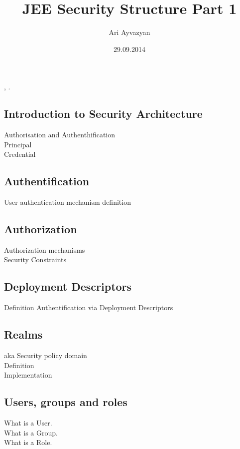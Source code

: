 \documentclass[12pt,a4paper,draft]{report}
\date{29.09.2014}
\author{Ari Ayvazyan}
\title{JEE Security Structure Part 1}
\begin{document}
\chapter*{\MyTitle}
\begin{flushright}
        \MyAuthor, \MyDate.
\end{flushright}


\section{Introduction to Security Architecture}
Authorisation and Authenthification \\
Principal\\
Credential

\section{Authentification}
User authentication mechanism definition

\section{Authorization}

Authorization mechanisms\\
Security Constraints

\section{Deployment Descriptors}
Definition
Authentification via Deployment Descriptors

\section{Realms}

aka Security policy domain\\
Definition\\
Implementation

\section{Users, groups and roles}
What is a User.\\
What is a Group.\\
What is a Role.\\
\end{document}
